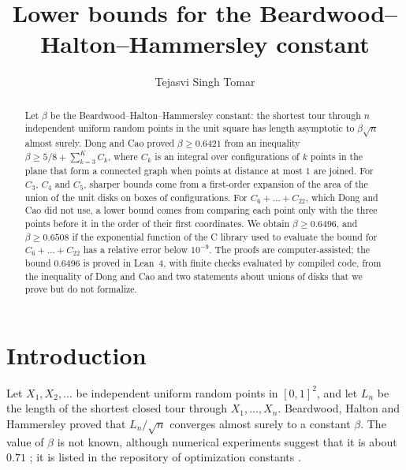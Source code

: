 \documentclass[11pt]{amsart}
\theoremstyle{definition}
\theoremstyle{remark}
\numberwithin{equation}{section}
\newcommand{\KmaxW}{22}
\newcommand{\LBMAIN}{0.6508}
\newcommand{\Kmax}{\KmaxW}
\begin{document}
\title[The Beardwood--Halton--Hammersley constant]{Lower bounds for the Beardwood--Halton--Hammersley constant}
\author{Tejasvi Singh Tomar}
\renewcommand{\urladdrname}{{\itshape ORCID}}

\begin{abstract}
Let $\beta$ be the Beardwood--Halton--Hammersley constant: the shortest tour through $n$ independent uniform random points in the unit square has length asymptotic to $\beta\sqrt n$ almost surely. Dong and Cao proved $\beta\ge0.6421$ from an inequality $\beta\ge5/8+\sum_{k=3}^{K}C_k$, where $C_k$ is an integral over configurations of $k$ points in the plane that form a connected graph when points at distance at most $1$ are joined. For $C_3$, $C_4$ and $C_5$, sharper bounds come from a first-order expansion of the area of the union of the unit disks on boxes of configurations. For $C_6+\dots+C_{\Kmax}$, which Dong and Cao did not use, a lower bound comes from comparing each point only with the three points before it in the order of their first coordinates. We obtain $\beta\ge0.6496$, and $\beta\ge\LBMAIN$ if the exponential function of the C library used to evaluate the bound for $C_6+\dots+C_{\Kmax}$ has a relative error below $10^{-9}$. The proofs are computer-assisted; the bound $0.6496$ is proved in Lean~4, with finite checks evaluated by compiled code, from the inequality of Dong and Cao and two statements about unions of disks that we prove but do not formalize.
\end{abstract}

\maketitle

\section{Introduction}\label{sec:intro}

Let $X_1,X_2,\dots$ be independent uniform random points in $[0,1]^2$, and let $L_n$ be the length of the shortest closed tour through $X_1,\dots,X_n$. Beardwood, Halton and Hammersley \cite{BHH59} proved that $L_n/\sqrt n$ converges almost surely to a constant $\beta$. The value of $\beta$ is not known, although numerical experiments suggest that it is about $0.71$ \cite{JMR96,Coo12}; it is listed in the repository of optimization constants \cite{Tao26}.
\end{document}
